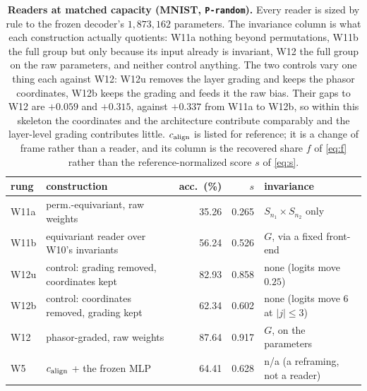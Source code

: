 \begin{table}[t]
\centering\small
\caption{\textbf{Readers at matched capacity (MNIST, \texttt{P-random}).} Every reader is sized by rule to the frozen decoder's $1{,}873{,}162$ parameters. The invariance column is what each construction actually quotients: W11a nothing beyond permutations, W11b the full group but only because its input already is invariant, W12 the full group on the raw parameters, and neither control anything. The two controls vary one thing each against W12: W12u removes the layer grading and keeps the phasor coordinates, W12b keeps the grading and feeds it the raw bias. Their gaps to W12 are $+0.059$ and $+0.315$, against $+0.337$ from W11a to W12b, so within this skeleton the coordinates and the architecture contribute comparably and the layer-level grading contributes little. $c_{\mathrm{align}}$ is listed for reference; it is a change of frame rather than a reader, and its column is the recovered share $f$ of \eqref{eq:f} rather than the reference-normalized score $s$ of \eqref{eq:s}.}
\label{tab:w12}
\begin{tabular}{@{}llrrl@{}}
\toprule
rung & construction & acc.\ (\%) & $s$ & invariance \\
\midrule
W11a & perm.-equivariant, raw weights & 35.26 & 0.265 & $S_{n_1}\times S_{n_2}$ only \\
W11b & equivariant reader over W10's invariants & 56.24 & 0.526 & $G$, via a fixed front-end \\
W12u & \quad control: grading removed, coordinates kept & 82.93 & 0.858 & none (logits move $0.25$) \\
W12b & \quad control: coordinates removed, grading kept & 62.34 & 0.602 & none (logits move $6$ at $|j|\le3$) \\
W12 & phasor-graded, raw weights & 87.64 & 0.917 & $G$, on the parameters \\
W5 & $c_{\mathrm{align}}$ + the frozen MLP & 64.41 & 0.628 & n/a (a reframing, not a reader) \\
\bottomrule
\end{tabular}
\end{table}
